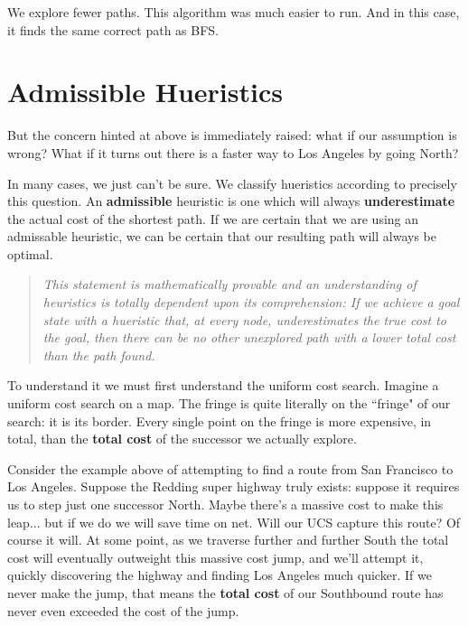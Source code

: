 \documentclass[12pt]{article}
\begin{document}
\newpage

We explore fewer paths. This algorithm was much easier to run. And in this case, it finds the same correct path as BFS.

\section*{Admissible Hueristics}

But the concern hinted at above is immediately raised: what if our assumption is wrong? What if it turns out there is a faster way to Los Angeles by going North?

In many cases, we just can't be sure. We classify hueristics according to precisely this question. An \textbf{admissible} heuristic is one which will always \textbf{underestimate} the actual cost of the shortest path. If we are certain that we are using an admissable heuristic, we can be certain that our resulting path will always be optimal.

\begin{quote}

\textit{This statement is mathematically provable and an understanding of heuristics is totally dependent upon its comprehension: If we achieve a goal state with a hueristic that, at every node, underestimates the true cost to the goal, then there can be no other unexplored path with a lower total cost than the path found.}

\end{quote}

To understand it we must first understand the uniform cost search. Imagine a uniform cost search on a map. The fringe is quite literally on the ``fringe" of our search: it is its border. Every single point on the fringe is more expensive, in total, than the \textbf{total cost} of the successor we actually explore.

Consider the example above of attempting to find a route from San Francisco to Los Angeles. Suppose the Redding super highway truly exists: suppose it requires us to step just one successor North. Maybe there's a massive cost to make this leap... but if we do we will save time on net. Will our UCS capture this route? Of course it will. At some point, as we traverse further and further South the total cost will eventually outweight this massive cost jump, and we'll attempt it, quickly discovering the highway and finding Los Angeles much quicker. If we never make the jump, that means the \textbf{total cost} of our Southbound route has never even exceeded the cost of the jump.
\end{document}
